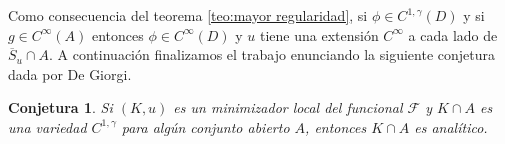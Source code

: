 \documentclass[a4paper,11pt,spanish, twoside, leqno]{tfm-uam}
\newtheorem{conjutura}[teo]{Conjetura}
\begin{document}
Como consecuencia del teorema \ref{teo:mayor regularidad}, si $\phi\in C^{1,\gamma}(D)$ y si $g\in C^{\infty}(A)$ entonces $\phi\in C^{\infty}(D)$ y $u$ tiene una extensión $C^{\infty}$ a cada lado de $\overline{S}_{u}\cap A$. A continuación finalizamos el trabajo enunciando la siguiente conjetura dada por De Giorgi.

\begin{conjutura}
Si $(K,u)$ es un minimizador local del funcional $\mathcal{F}$ y $K\cap A$ es una variedad $C^{1,\gamma}$ para algún conjunto abierto $A$, entonces $K\cap A$ es analítico.
\end{conjutura}


\printindex

\nocite{*} %
%



\cleardoublepage
\end{document}
